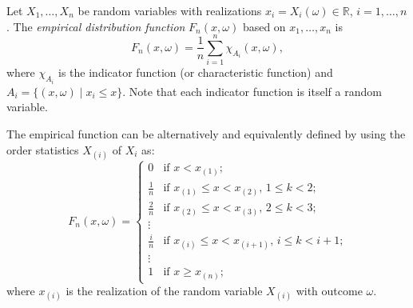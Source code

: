 \documentclass[12pt]{article}
\begin{document}
Let $X_1,\ldots,X_n$ be random variables with realizations $x_i=X_i(\omega)\in\mathbb{R}$, $i=1,\ldots,n$.  The \emph{empirical distribution function} $F_n(x,\omega)$ based on $x_1,\ldots,x_n$ is
$$F_n(x,\omega)=\frac{1}{n}\sum_{i=1}^{n}\chi_{A_i}(x,\omega),$$
where $\chi_{A_i}$ is the indicator function (or characteristic function) and $A_i=\lbrace(x,\omega)\mid x_i\leq x \rbrace$.  Note that each indicator function is itself a random variable.
\par
The empirical function can be alternatively and equivalently defined by using the order statistics $X_{(i)}$ of $X_i$ as:
$$
F_n(x,\omega)= 
\begin{cases}
0 & \text{if $x<x_{(1)}$;}\\
\frac{1}{n} & \text{if $x_{(1)}\leq x<x_{(2)}$, $1\leq k<2$;}\\
\frac{2}{n} & \text{if $x_{(2)}\leq x<x_{(3)}$, $2\leq k<3$;}\\
\vdots\\
\frac{i}{n} & \text{if $x_{(i)}\leq x<x_{(i+1)}$, $i\leq k<i+1$;}\\
\vdots\\
1 & \text{if $x\geq x_{(n)}$;}
\end{cases}
$$
where $x_{(i)}$ is the realization of the random variable $X_{(i)}$ with outcome $\omega$.
\end{document}
